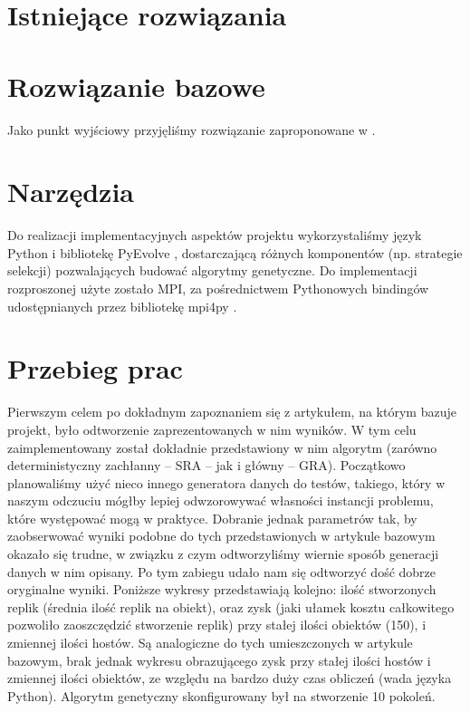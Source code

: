\documentclass[11pt,pdftex,a4paper]{scrartcl}
\begin{document}
\section{Istniejące rozwiązania}

\section{Rozwiązanie bazowe}
Jako punkt wyjściowy przyjęliśmy rozwiązanie zaproponowane w \cite{Ahmad}.

\section{Narzędzia}
Do realizacji implementacyjnych aspektów projektu wykorzystaliśmy język Python i bibliotekę
PyEvolve \cite{pyevolve}, dostarczającą różnych komponentów (np. strategie selekcji) pozwalających
budować algorytmy genetyczne. Do implementacji rozproszonej użyte zostało MPI, za pośrednictwem
Pythonowych bindingów udostępnianych przez bibliotekę mpi4py \cite{mpi4py}.

\section{Przebieg prac}
Pierwszym celem po dokładnym zapoznaniem się z artykułem, na którym bazuje projekt, było odtworzenie
zaprezentowanych w nim wyników. W tym celu zaimplementowany został dokładnie przedstawiony w nim
algorytm (zarówno deterministyczny zachłanny -- SRA -- jak i główny -- GRA). Początkowo planowaliśmy
użyć nieco innego generatora danych do testów, takiego, który w naszym odczuciu mógłby lepiej
odwzorowywać własności instancji problemu, które występować mogą w praktyce. Dobranie jednak parametrów
tak, by zaobserwować wyniki podobne do tych przedstawionych w artykule bazowym okazało się trudne,
w związku z czym odtworzyliśmy wiernie sposób generacji danych w nim opisany. Po tym zabiegu
udało nam się odtworzyć dość dobrze oryginalne wyniki. Poniższe wykresy przedstawiają kolejno: ilość 
stworzonych replik (średnia ilość replik na obiekt), oraz zysk (jaki ułamek kosztu całkowitego
pozwoliło zaoszczędzić stworzenie replik) przy stałej ilości obiektów (150), i zmiennej ilości
hostów. Są analogiczne do tych umieszczonych w artykule bazowym, brak jednak wykresu obrazującego
zysk przy stałej ilości hostów i zmiennej ilości obiektów, ze względu na bardzo duży czas obliczeń
(wada języka Python). Algorytm genetyczny skonfigurowany był na stworzenie 10 pokoleń.
\end{document}
